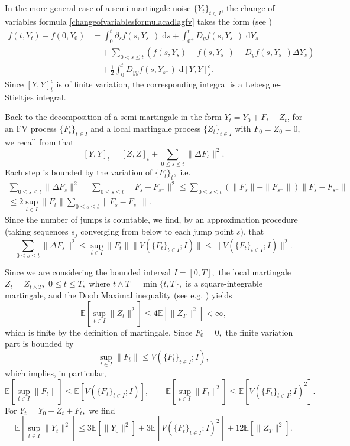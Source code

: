 \documentclass[reqno,12pt]{amsart}
\theoremstyle{plain} %
\theoremstyle{definition} %
\begin{document}
In the more general case of a semi-martingale noise $\{Y_t\}_{t\in I}$, the change of variables formula \eqref{changeofvariablesformulacadlagfv} takes the form (see \cite[Theorems II.32 and II.33]{Protter2005})
\begin{equation}
    \label{changeofvariablesformulasemimartingale}
    \begin{aligned}
        f(t, Y_t) - f(0, Y_0) & = \int_0^t \partial_s f(s, Y_{s^-})\;\mathrm{d}s + \int_{0^+}^t D_y f(s, Y_{s^-}) \;\mathrm{d}Y_s \\
        & \quad + \sum_{0 < s \leq t} \left( f(s, Y_s) - f(s, Y_{s^{-}}) - D_y f(s, Y_{s^-})\Delta Y_s\right) \\
        & \quad + \frac{1}{2}\int_0^t D_{yy}f(s, Y_{s^-})\;\mathrm{d}[Y, Y]_s^c.
    \end{aligned}
\end{equation}
Since $[Y, Y]_t^c$ is of finite variation, the corresponding integral is a Lebesgue-Stieltjes integral.

Back to the decomposition of a semi-martingale in the form $Y_t = Y_0 + F_t + Z_t$, for an FV process $\{F_t\}_{t\in I}$ and a local martingale process $\{Z_t\}_{t\in I}$ with $F_0 = Z_0 = 0,$ we recall from \cite[Lemma 18.7]{Metivier1982} that
\[
    [Y, Y]_t = [Z, Z]_t + \sum_{0 \leq s \leq t} \|\Delta F_s\|^2.
\]
Each step is bounded by the variation of $\{F_t\}_t,$ i.e.
\begin{multline*}
    \sum_{0 \leq s \leq t} \|\Delta F_s\|^2 = \sum_{0 \leq s \leq t} \|F_s - F_{s^-}\|^2 \leq \sum_{0 \leq s \leq t} (\|F_s\| + \|F_{s^-}\|)\|F_s - F_{s^-}\| \\
    \leq 2\sup_{t\in I} \|F_t\| \sum_{0 \leq s \leq t} \|F_s - F_{s^-}\|.
\end{multline*}
Since the number of jumps is countable, we find, by an approximation procedure (taking sequences $s_j$ converging from below to each jump point $s$), that
\[
    \sum_{0 \leq s \leq t} \|\Delta F_s\|^2 \leq \sup_{t\in I} \|F_t\| \|V(\{F_t\}_{t\in I}; I)\| \leq \|V(\{F_t\}_{t\in I}; I)\|^2.
\]

Since we are considering the bounded interval $I=[0, T],$ the local martingale $Z_t = Z_{t \land T},$ $0\leq t \leq T,$ where $t \land T = \min\{t, T\},$ is a square-integrable martingale, and the Doob Maximal inequality (see e.g. \cite[Theorem I.20]{Protter2005}) yields
\[
    \mathbb{E}\left[\sup_{t\in I} \|Z_t\|^2\right] \leq 4\mathbb{E}[\|Z_T\|^2] < \infty,
\]
which is finite by the definition of martingale. Since $F_0 = 0,$ the finite variation part is bounded by
\[
    \sup_{t\in I} \|F_t\| \leq V(\{F_t\}_{t\in I}; I),
\]
which implies, in particular,
\[
    \mathbb{E}\left[\sup_{t\in I} \|F_t\|\right] \leq \mathbb{E}\left[V(\{F_t\}_{t\in I}; I)\right], \qquad \mathbb{E}\left[\sup_{t\in I} \|F_t\|^2\right] \leq \mathbb{E}\left[V(\{F_t\}_{t\in I}; I)^2\right].
\]
For $Y_t = Y_0 + Z_t + F_t,$ we find
\[
    \mathbb{E}\left[\sup_{t\in I} \|Y_t\|^2\right] \leq 3\mathbb{E}[\|Y_0\|^2] + 3\mathbb{E}\left[V(\{F_t\}_{t\in I}; I)^2\right] + 12\mathbb{E}[\|Z_T\|^2].
\]
\end{document}
